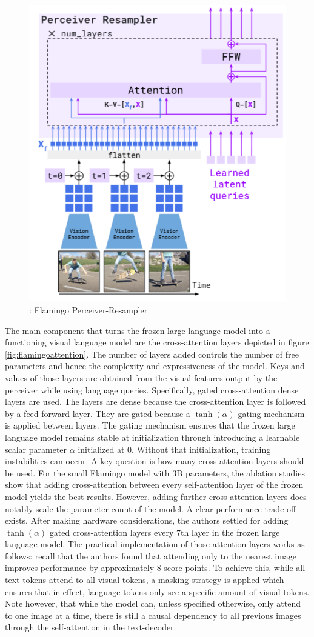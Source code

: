 \documentclass[
]{krantz}
\begin{document}
\begin{figure}

{\centering \includegraphics[width=0.5\linewidth]{figures/05-chapter2/perceiver} 

}

\caption{\citet{alayrac2022flamingo}: Flamingo Perceiver-Resampler}\label{fig:perceiver}
\end{figure}



The main component that turns the frozen large language model into a functioning visual language model are the cross-attention layers depicted in figure \ref{fig:flamingoattention}. The number of layers added controls the number of free parameters and hence the complexity and expressiveness of the model. Keys and values of those layers are obtained from the visual features output by the perceiver while using language queries. Specifically, gated cross-attention dense layers are used. The layers are dense because the cross-attention layer is followed by a feed forward layer. They are gated because a \(\tanh(\alpha)\) gating mechanism is applied between layers. The gating mechanism ensures that the frozen large language model remains stable at initialization through introducing a learnable scalar parameter \(\alpha\) initialized at 0. Without that initialization, training instabilities can occur. A key question is how many cross-attention layers should be used. For the small Flamingo model with 3B parameters, the ablation studies show that adding cross-attention between every self-attention layer of the frozen model yields the best results. However, adding further cross-attention layers does notably scale the parameter count of the model. A clear performance trade-off exists. After making hardware considerations, the authors settled for adding \(\tanh(\alpha)\) gated cross-attention layers every 7th layer in the frozen large language model. The practical implementation of those attention layers works as follows: recall that the authors found that attending only to the nearest image improves performance by approximately 8 score points. To achieve this, while all text tokens attend to all visual tokens, a masking strategy is applied which ensures that in effect, language tokens only see a specific amount of visual tokens. Note however, that while the model can, unless specified otherwise, only attend to one image at a time, there is still a causal dependency to all previous images through the self-attention in the text-decoder.
\end{document}
